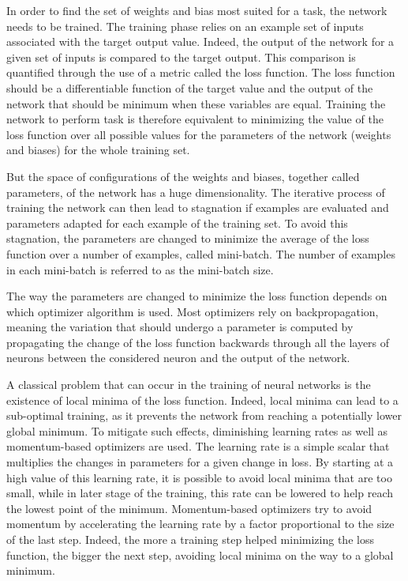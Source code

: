 In order to find the set of weights and bias most suited for a task, the network needs to be trained.
The training phase relies on an example set of inputs associated with the target output value. Indeed, the output of the network for a given set of inputs is compared to the target output. This comparison is quantified through the use of a metric called the loss function. The loss function should be a differentiable function of the target value and the output of the network that should be minimum when these variables are equal. Training the network to perform task is therefore equivalent to minimizing the value of the loss function over all possible values for the parameters of the network (weights and biases) for the whole training set.

But the space of configurations of the weights and biases, together called parameters, of the network has a huge dimensionality. The iterative process of training the network can then lead to stagnation if examples are evaluated and parameters adapted for each example of the training set. To avoid this stagnation, the parameters are changed to minimize the average of the loss function over a number of examples, called mini-batch. The number of examples in each mini-batch is referred to as the mini-batch size.

The way the parameters are changed to minimize the loss function depends on which optimizer algorithm is used. Most optimizers rely on backpropagation, meaning the variation that should undergo a parameter is computed by propagating the change of the loss function backwards through all the layers of neurons between the considered neuron and the output of the network. 


A classical problem that can occur in the training of neural networks is the existence of local minima of the loss function. Indeed, local minima can lead to a sub-optimal training, as it prevents the network from reaching a potentially lower global minimum. To mitigate such effects, diminishing learning rates as well as momentum-based optimizers are used. The learning rate is a simple scalar that multiplies the changes in parameters for a given change in loss. By starting at a high value of this learning rate, it is possible to avoid local minima that are too small, while in later stage of the training, this rate can be lowered to help reach the lowest point of the minimum. Momentum-based optimizers try to avoid momentum by accelerating the learning rate by a factor proportional to the size of the last step. Indeed, the more a training step helped minimizing the loss function, the bigger the next step, avoiding local minima on the way to a global minimum.

